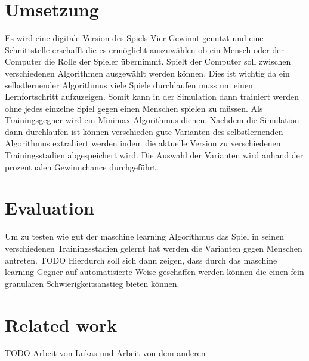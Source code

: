 \section{Umsetzung}

Es wird eine digitale Version des Spiels Vier Gewinnt genutzt und eine Schnittstelle erschafft die es ermöglicht auszuwählen ob ein Mensch oder der Computer die Rolle der Spieler übernimmt. Spielt der Computer soll zwischen verschiedenen Algorithmen ausgewählt werden können. Dies ist wichtig da ein selbstlernender Algorithmus viele Spiele durchlaufen muss um einen Lernfortschritt aufzuzeigen. Somit kann in der Simulation dann trainiert werden ohne jedes einzelne Spiel gegen einen Menschen spielen zu müssen. Als Trainingsgegner wird ein Minimax Algorithmus dienen. Nachdem die Simulation dann durchlaufen ist können verschieden gute Varianten des selbstlernenden Algorithmus extrahiert werden indem die aktuelle Version zu verschiedenen Trainingsstadien abgespeichert wird. Die Auswahl der Varianten wird anhand der prozentualen Gewinnchance durchgeführt. 

\section{Evaluation}
Um zu testen wie gut der maschine learning Algorithmus das Spiel in seinen verschiedenen Trainingsstadien gelernt hat werden die Varianten gegen Menschen antreten. 
\colorbox{red!30}{TODO}
Hierdurch soll sich dann zeigen, dass durch das maschine learning Gegner auf automatisierte Weise geschaffen werden können die einen fein granularen Schwierigkeitsanstieg bieten können.

\section{Related work}
\colorbox{red!30}{TODO Arbeit von Lukas und Arbeit von dem anderen}









